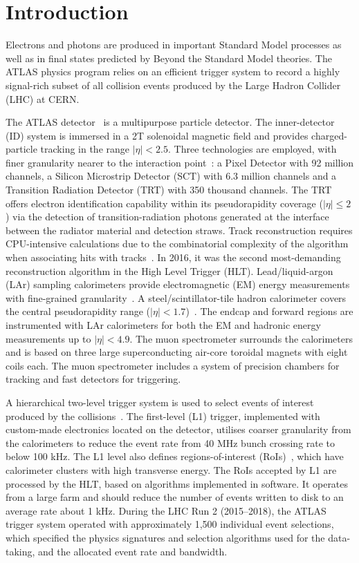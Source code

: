 \chapter{Introduction}

Electrons and photons are produced in important Standard Model processes as well as in final states predicted by Beyond the Standard Model theories. 
The ATLAS physics program relies on an efficient trigger system to record a highly signal-rich subset of all collision events produced by the Large Hadron Collider (LHC) at CERN.

The ATLAS detector~\cite{PERF-2007-01} is a multipurpose particle detector. 
The inner-detector (ID) system is immersed in a 2T solenoidal magnetic field and provides charged-particle tracking in the range $|\eta|<2.5$.  
Three technologies are employed, with finer granularity nearer to the interaction point~\cite{PERF-2015-08,CERN-LHCC-97-016,Haywood:331064}: a Pixel Detector with 92 million channels, a Silicon Microstrip Detector (SCT) with 6.3 million channels and a Transition Radiation Detector (TRT) with 350 thousand channels. 
The TRT offers electron identification capability within its pseudorapidity coverage ($|\eta|\leq 2$) via the detection of transition-radiation photons generated at the interface between the radiator material and detection straws. 
Track reconstruction requires CPU-intensive calculations due to the combinatorial complexity of the algorithm when associating hits with tracks~\cite{PERF-2015-08}. 
In 2016, it was the second most-demanding reconstruction algorithm in the High Level Trigger (HLT).
Lead/liquid-argon (LAr) sampling calorimeters provide electromagnetic (EM) energy measurements with fine-grained granularity~\cite{LARG-2009-01,larg_tdr}. 
A steel/scintillator-tile hadron calorimeter covers the central pseudorapidity range ($|\eta|< 1.7$)~\cite{TCAL-2017-01,tile_tdr}. 
The endcap and forward regions are instrumented with LAr calorimeters for both the EM and hadronic energy measurements up to $|\eta|< 4.9$. 
The muon spectrometer surrounds the calorimeters and is based on three large superconducting air-core toroidal magnets with eight coils each.  
The muon spectrometer includes a system of precision chambers for tracking and fast detectors for triggering. 

A hierarchical two-level trigger system is used to select events of interest produced by the collisions~\cite{aad2020performance}. 
The first-level (L1) trigger, implemented with custom-made electronics located on the detector, utilises coarser granularity from the calorimeters to reduce the event rate from 40 MHz bunch crossing rate to below 100 kHz. 
The L1 level also defines regions-of-interest (RoIs)~\cite{CERN-LHCC-2017-020}, which have calorimeter clusters with high transverse energy. The RoIs accepted by L1 are processed by the HLT, based on algorithms implemented in software. It operates from a large farm and should reduce the number of events written to disk to an average rate about 1 kHz. During the LHC Run 2 (2015–2018), the ATLAS trigger system operated with approximately 1,500 individual event selections, which specified the physics signatures and selection algorithms used for the data-taking, and the allocated event rate and bandwidth.

